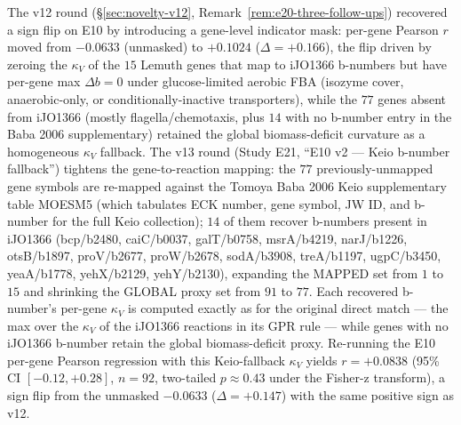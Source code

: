 \documentclass[11pt,a4paper]{article}
\theoremstyle{plain}
\theoremstyle{definition}
\theoremstyle{remark}
\begin{document}
The v12 round (\S\ref{sec:novelty-v12}, Remark~\ref{rem:e20-three-follow-ups})
recovered a sign flip on E10 by introducing a gene-level indicator mask:
per-gene Pearson $r$ moved from $-0.0633$ (unmasked) to $+0.1024$
($\Delta = +0.166$), the flip driven by zeroing the $\kappa_V$ of the
$15$ Lemuth genes that map to iJO1366 b-numbers but have per-gene max
$\Delta b = 0$ under glucose-limited aerobic FBA (isozyme cover,
anaerobic-only, or conditionally-inactive transporters), while the
$77$ genes absent from iJO1366 (mostly flagella/chemotaxis, plus $14$
with no b-number entry in the Baba 2006 supplementary) retained the
global biomass-deficit curvature as a homogeneous $\kappa_V$ fallback.
The v13 round (Study E21, ``E10 v2 --- Keio b-number fallback'') tightens
the gene-to-reaction mapping: the $77$ previously-unmapped gene symbols
are re-mapped against the Tomoya Baba 2006 Keio supplementary table
MOESM5 (which tabulates ECK number, gene symbol, JW ID, and b-number for
the full Keio collection); $14$ of them recover b-numbers present in
iJO1366 (bcp/b2480, caiC/b0037, galT/b0758, msrA/b4219, narJ/b1226,
otsB/b1897, proV/b2677, proW/b2678, sodA/b3908, treA/b1197, ugpC/b3450,
yeaA/b1778, yehX/b2129, yehY/b2130), expanding the MAPPED set from $1$
to $15$ and shrinking the GLOBAL proxy set from $91$ to $77$. Each
recovered b-number's per-gene $\kappa_V$ is computed exactly as for the
original direct match --- the max over the $\kappa_V$ of the iJO1366
reactions in its GPR rule --- while genes with no iJO1366 b-number
retain the global biomass-deficit proxy. Re-running the E10 per-gene
Pearson regression with this Keio-fallback $\kappa_V$ yields $r =
+0.0838$ (95\% CI $[-0.12, +0.28]$, $n=92$, two-tailed $p \approx
0.43$ under the Fisher-z transform), a sign flip from the unmasked
$-0.0633$ ($\Delta = +0.147$) with the same positive sign as v12.
\end{document}
